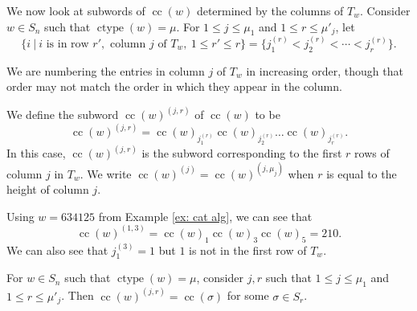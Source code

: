 \documentclass[ALCO, Unicode]{cedram}
\DeclareMathOperator{\ctype}{ctype}
\DeclareMathOperator{\cc}{cc}
\begin{document}
We now look at subwords of $\cc(w)$ determined by the columns of $T_w$. Consider $w\in S_n$ such that $\ctype(w) = \mu$.
For $1\leq j \leq \mu_1$ and $1\leq r \leq \mu'_j$, let \[\{i \ | \ i \text{ is in row } r', \text{ column } j \text{ of } T_w, \ 1\leq r' \leq r\} = \{j^{(r)}_1 < j^{(r)}_2 < \cdots < j^{(r)}_r\}.\]

We are numbering the entries in column $j$ of $T_w$ in increasing order, though that order may not match the order in which they appear in the column. 

We define the subword $\cc(w)^{(j,r)}$ of $\cc(w)$ to be \[\cc(w)^{(j,r)} = \cc(w)_{j^{(r)}_1}\cc(w)_{j^{(r)}_2}\dots \cc(w)_{j^{(r)}_r}.\]
In this case, $\cc(w)^{(j,r)}$ is the subword corresponding to the first $r$ rows of column $j$ in $T_w$. We write $\cc(w)^{(j)} = \cc(w)^{(j,\mu_j)}$ when $r$ is equal to the height of column $j$.


\begin{ex}
   Using $w=  634125 $ from Example \ref{ex: cat alg}, we can see that \[\cc(w)^{(1,3)} = \cc(w)_1\cc(w)_3\cc(w)_5 = 210.\]
We can also see that $j^{(3)}_1 = 1$ but $1$ is not in the first row of $T_w$. 
\end{ex}


\begin{prop}\label{prop: subword of column is a cocharge word}
For $w\in S_n$ such that $\ctype(w) = \mu$, consider $j,r$ such that $1\leq j \leq \mu_1$ and $1\leq r \leq \mu'_j$.
Then $\cc(w)^{(j,r)} = \cc(\sigma)$ for some $\sigma \in S_r$.
\end{prop}
\end{document}
